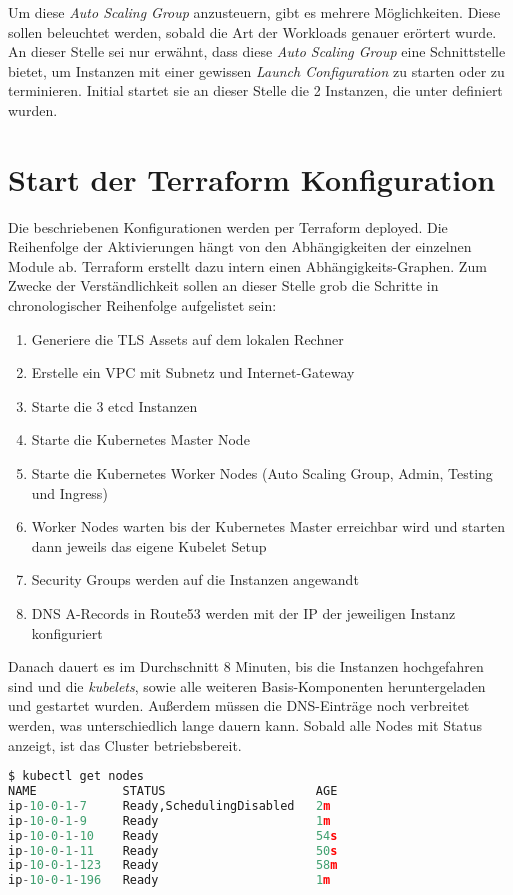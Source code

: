 Um diese \emph{Auto Scaling Group} anzusteuern, gibt es mehrere
Möglichkeiten. Diese
sollen beleuchtet werden, sobald die Art der Workloads genauer erörtert wurde.
An dieser Stelle sei nur erwähnt, dass diese \emph{Auto Scaling Group} eine
Schnittstelle
bietet, um Instanzen mit einer gewissen \emph{Launch Configuration} zu starten oder
zu terminieren.
Initial startet sie an dieser Stelle die 2 Instanzen, die unter
definiert wurden.

\section{Start der Terraform Konfiguration}
Die beschriebenen Konfigurationen werden per Terraform deployed.
Die Reihenfolge der Aktivierungen hängt von den Abhängigkeiten
der einzelnen Module ab.
Terraform erstellt dazu intern einen Abhängigkeits-Graphen. Zum Zwecke
der Verständlichkeit
sollen an dieser Stelle grob die Schritte in chronologischer
Reihenfolge aufgelistet sein:

\begin{enumerate}
  \item Generiere die TLS Assets auf dem lokalen Rechner
  \item Erstelle ein VPC mit Subnetz und Internet-Gateway
  \item Starte die 3 etcd Instanzen
  \item Starte die Kubernetes Master Node
  \item Starte die Kubernetes Worker Nodes (Auto Scaling Group, Admin, Testing
  und Ingress)
  \item Worker Nodes warten bis der Kubernetes Master erreichbar wird und starten
  dann jeweils das eigene Kubelet Setup
  \item Security Groups werden auf die Instanzen angewandt
  \item DNS A-Records in Route53 werden mit der IP der
  jeweiligen Instanz konfiguriert
\end{enumerate}

Danach dauert es im Durchschnitt 8 Minuten, bis die Instanzen hochgefahren sind
und die \emph{kubelets}, sowie alle
weiteren Basis-Komponenten heruntergeladen und gestartet wurden. Außerdem müssen
die DNS-Einträge noch verbreitet werden, was unterschiedlich lange dauern kann.
Sobald  alle Nodes mit Status  anzeigt,
ist das Cluster betriebsbereit.

\begin{lstlisting}[language=Python,numbers=none]
$ kubectl get nodes
NAME            STATUS                     AGE
ip-10-0-1-7     Ready,SchedulingDisabled   2m
ip-10-0-1-9     Ready                      1m
ip-10-0-1-10    Ready                      54s
ip-10-0-1-11    Ready                      50s
ip-10-0-1-123   Ready                      58m
ip-10-0-1-196   Ready                      1m\end{lstlisting}

